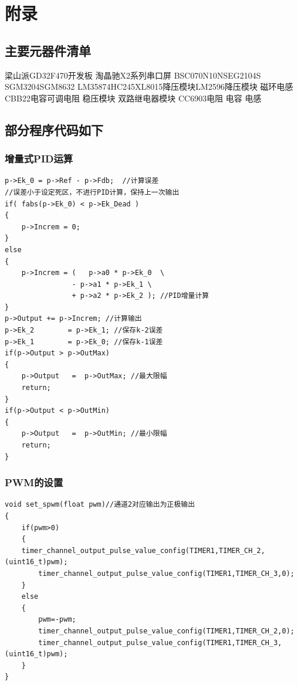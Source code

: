 \documentclass[a4paper,12pt]{article}
\begin{document}
\newpage

\appendix
\section{附录}
\subsection*{主要元器件清单}
\noindent 梁山派GD32F470开发板 \quad 淘晶驰X2系列串口屏 
\quad BSC070N10NS\quad EG2104S \quad SGM3204\quad SGM8632
\quad LM358\quad 74HC245\quad  XL8015降压模块\quad LM2596降压模块
\quad 磁环电感\quad \newline CBB22电容\quad 可调电阻 \quad 稳压模块 
\quad 双路继电器模块 \quad CC6903\quad 电阻 \quad 电容 \quad 电感 \quad 
\subsection*{部分程序代码如下}
\subsubsection*{增量式PID运算}
\begin{verbatim}
p->Ek_0 = p->Ref - p->Fdb;  //计算误差
//误差小于设定死区，不进行PID计算，保持上一次输出
if( fabs(p->Ek_0) < p->Ek_Dead )
{
    p->Increm = 0;
}
else
{
    p->Increm = (   p->a0 * p->Ek_0  \
                - p->a1 * p->Ek_1 \
                + p->a2 * p->Ek_2 ); //PID增量计算  
}
p->Output += p->Increm; //计算输出
p->Ek_2        = p->Ek_1; //保存k-2误差
p->Ek_1        = p->Ek_0; //保存k-1误差
if(p->Output > p->OutMax)
{
    p->Output   =  p->OutMax; //最大限幅
    return;
}
if(p->Output < p->OutMin)
{
    p->Output   =  p->OutMin; //最小限幅
    return;
}
\end{verbatim} 
\subsubsection*{PWM的设置}
\begin{verbatim}
void set_spwm(float pwm)//通道2对应输出为正极输出
{
    if(pwm>0)
    {
    timer_channel_output_pulse_value_config(TIMER1,TIMER_CH_2,(uint16_t)pwm);
        timer_channel_output_pulse_value_config(TIMER1,TIMER_CH_3,0);
    }
    else
    {
        pwm=-pwm;
        timer_channel_output_pulse_value_config(TIMER1,TIMER_CH_2,0);
        timer_channel_output_pulse_value_config(TIMER1,TIMER_CH_3,(uint16_t)pwm);   
    }
}
\end{verbatim}
\end{document}
